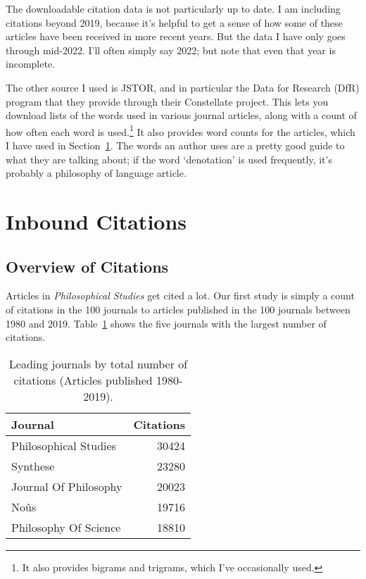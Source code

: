 \documentclass[
  10pt,
  letterpaper,
  DIV=11,
  numbers=noendperiod,
  twoside]{scrartcl}
\begin{document}
The downloadable citation data is not particularly up to date. I am
including citations beyond 2019, because it's helpful to get a sense of
how some of these articles have been received in more recent years. But
the data I have only goes through mid-2022. I'll often simply say 2022;
but note that even that year is incomplete.

The other source I used is JSTOR, and in particular the Data for
Research (DfR) program that they provide through their Constellate
project. This lets you download lists of the words used in various
journal articles, along with a count of how often each word is
used.\footnote{It also provides bigrams and trigrams, which I've
  occasionally used.} It also provides word counts for the articles,
which I have used in Section~\ref{sec-overview}. The words an author
uses are a pretty good guide to what they are talking about; if the word
`denotation' is used frequently, it's probably a philosophy of language
article.

\section{Inbound Citations}\label{sec-overview}

\subsection{Overview of Citations}\label{sec-citations-overview}

Articles in \emph{Philosophical Studies} get cited a lot. Our first
study is simply a count of citations in the 100 journals to articles
published in the 100 journals between 1980 and 2019.
Table~\ref{tbl-all-cites} shows the five journals with the largest
number of citations.

\begin{longtable}[]{@{}lr@{}}

\caption{\label{tbl-all-cites}Leading journals by total number of
citations (Articles published 1980-2019).}

\tabularnewline

\toprule\noalign{}
Journal & Citations \\
\midrule\noalign{}
\endhead
\bottomrule\noalign{}
\endlastfoot
Philosophical Studies & 30424 \\
Synthese & 23280 \\
Journal Of Philosophy & 20023 \\
Noûs & 19716 \\
Philosophy Of Science & 18810 \\

\end{longtable}
\end{document}

